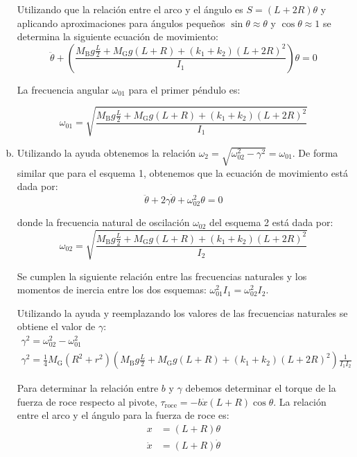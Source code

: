 \begin{enumerate}[a)]
	Utilizando que la relaci\'on entre el arco y el \'angulo es $S=(L+2R)\theta$ y aplicando aproximaciones para \'angulos peque\~nos $\sin\theta\approx\theta$ y $\cos\theta\approx1$ se determina la siguiente ecuaci\'on de movimiento:
	\begin{equation*}
	\ddot\theta + \left( \frac{M_{\text{B}}g\frac{L}{2} + M_{\text{G}}g(L+R) + (k_1+k_2){(L+2R)}^2}{I_1}\right) \theta = 0
	\end{equation*}
	
	La frecuencia angular $\omega_{01}$ para el primer p\'endulo es:
	
	\begin{equation*}
		\omega_{01}=\sqrt{\frac{M_{\text{B}}g\frac{L}{2} + M_{\text{G}}g(L+R) + (k_1+k_2){(L+2R)}^2}{I_1}}
	\end{equation*}

\item Utilizando la ayuda obtenemos la relaci\'on $\omega_2=\sqrt{\omega_{02}^2-{\gamma}^2}=\omega_{01}$. De forma similar que para el esquema 1, obtenemos que la ecuaci\'on de movimiento est\'a dada por:
	\begin{equation*}
	\ddot\theta + 2 \gamma \dot\theta + \omega_{02}^2 \theta = 0
	\end{equation*}
	
	\noindent donde la frecuencia natural de oscilaci\'on $\omega_{02}$ del esquema 2 est\'a dada por:
	\begin{equation*}
	\omega_{02} = \sqrt{\frac{M_{\text{B}}g\frac{L}{2} + M_{\text{G}}g(L+R) + (k_1+k_2){(L+2R)}^2}{I_2}}
	\end{equation*}
	
	Se cumplen la siguiente relaci\'on entre las frecuencias naturales y los momentos de inercia entre los dos esquemas: $\omega_{01}^2I_1=\omega_{02}^2I_2$.
	
	Utilizando la ayuda y reemplazando los valores de las frecuencias naturales se obtiene el valor de $\gamma$:
	\begin{gather*}
		\gamma^2=\omega_{02}^2-\omega_{01}^2\\
		{\gamma}^2= \frac{1}{4}M_{\text{G}}\left( R^2+r^2 \right) \left( M_{\text{B}}g\frac{L}{2} + M_{\text{G}}g(L+R) + (k_1+k_2){(L+2R)}^2 \right) \frac{1}{I_1I_2}
	\end{gather*}

	Para determinar la relaci\'on entre $b$ y $\gamma$ debemos determinar el torque de la fuerza de roce respecto al pivote, $\tau_{\text{roce}}=-b\dot x (L+R)\cos\theta$. La relaci\'on entre el arco y el \'angulo para la fuerza de roce es:
	\begin{align*}
		x&=(L+R)\theta\\
		\dot x&= (L+R)\dot\theta
	\end{align*}


\end{enumerate}
